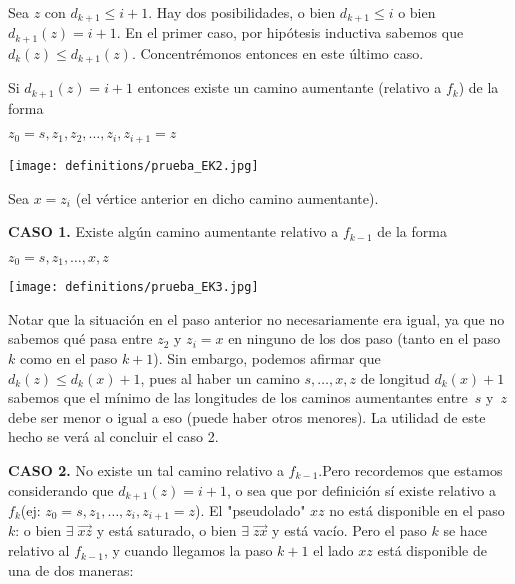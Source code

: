 \documentclass[10pt,a4paper]{article}
\begin{document}
Sea $z$ con $d_{k+1} \leq i + 1$. Hay dos posibilidades, o bien $d_{k+1}\leq i$ o bien $d_{k+1}(z) = i + 1$. En el primer caso, por hipótesis inductiva sabemos que $d_k(z) \leq d_{k+1}(z)$. Concentrémonos entonces en este último caso.

Si $d_{k+1}(z) = i + 1$ entonces existe un camino aumentante (relativo a $f_k$) de la forma

\begin{center}
$z_0 = s, z_1, z_2, \dots, z_i, z_{i+1}=z$
\end{center}

\begin{center}

    \begin{adjustbox}{max size={\textwidth}{\textheight}}
        \texttt{[image: definitions/prueba\_EK2.jpg]}
        \end{adjustbox}
    
\end{center}

Sea $x = z_i$ (el vértice anterior en dicho camino aumentante).

\textbf{CASO 1.} Existe algún camino aumentante relativo a $f_{k-1}$ de la forma 

\begin{center}
$z_0=s, z_1,\dots,x,z$
\end{center}

\begin{center}

    \begin{adjustbox}{max size={\textwidth}{\textheight}}
        \texttt{[image: definitions/prueba\_EK3.jpg]}
        \end{adjustbox}
    
\end{center}

Notar que la situación en el paso anterior no necesariamente era igual, ya que no sabemos qué pasa entre $z_2$ y $z_i = x$ en ninguno de los dos paso (tanto en el paso $k$ como en el paso $k+1$). Sin embargo, podemos afirmar que $d_k(z) \leq d_k(x)+1$, pues al haber un camino $s, \dots,x,z $ de longitud $d_k(x)+1$ sabemos que el mínimo de las longitudes de los caminos aumentantes entre $s$ y $z$ debe ser menor o igual a eso (puede haber otros menores). La utilidad de este hecho se verá al concluir el caso 2.

\textbf{CASO 2.} No existe un tal camino relativo a $f_{k-1}$.Pero recordemos que estamos considerando que $d_{k+1}(z)=i+1$, o sea que por definición sí existe relativo a $f_k$(ej: $z_0=s,z_1,\dots,z_i,z_{i+1} = z$). El "pseudolado" $xz$ no está disponible en el paso $k$: o bien $\exists\;\overrightarrow{xz}$ y está saturado, o bien $\exists\;\overrightarrow{zx}$ y está vacío. Pero el paso $k$ se hace relativo al $f_{k-1}$, y cuando llegamos la paso $k+1$ el lado $xz$ está disponible de una de dos maneras:
\end{document}
